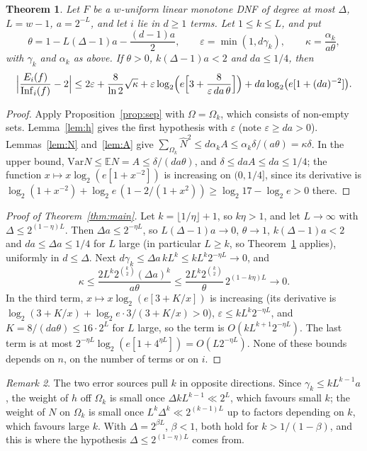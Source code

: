 \documentclass[11pt]{amsart}
\newtheorem{theorem}{Theorem}
\theoremstyle{remark}
\newtheorem{remark}[theorem]{Remark}
\newcommand{\Inf}{\mathrm{Inf}}
\newcommand{\Var}{\mathrm{Var}}
\newcommand{\E}{\mathbb{E}}
\begin{document}
\begin{theorem}\label{thm:lin}
Let $F$ be a $w$-uniform linear monotone DNF of degree at most $\Delta$, $L=w-1$, $a=2^{-L}$, and let $i$ lie in $d\ge1$
terms. Let $1\le k\le L$, and put
\[
\theta=1-L(\Delta-1)a-\frac{(d-1)a}2,\qquad \varepsilon=\min(1,d\gamma_k),\qquad \kappa=\frac{\alpha_k}{a\theta},
\]
with $\gamma_k$ and $\alpha_k$ as above. If $\theta>0$, $k(\Delta-1)a<2$ and $da\le1/4$, then
\[
\Bigl|\frac{E_i(f)}{\Inf_i(f)}-2\Bigr|\le2\varepsilon+\frac8{\ln2}\sqrt\kappa
+\varepsilon\log_2\Bigl(e\Bigl[3+\frac{8}{\varepsilon\,da\,\theta}\Bigr]\Bigr)+da\log_2\bigl(e[1+(da)^{-2}]\bigr).
\]
\end{theorem}

\begin{proof}
Apply Proposition~\ref{prop:sep} with $\Omega=\Omega_k$, which consists of non-empty sets. Lemma~\ref{lem:h} gives the
first hypothesis with $\varepsilon$ (note $\varepsilon\ge da>0$). Lemmas~\ref{lem:N} and~\ref{lem:A} give
$\sum_{\Omega_k}\hat N^2\le d\alpha_kA\le\alpha_k\delta/(a\theta)=\kappa\delta$. In the upper bound, $\Var N\le\E N=A\le
\delta/(da\theta)$, and $\delta\le daA\le da\le1/4$; the function $x\mapsto x\log_2(e[1+x^{-2}])$ is increasing on
$(0,1/4]$, since its derivative is $\log_2(1+x^{-2})+\log_2e\,(1-2/(1+x^2))\ge\log_2 17-\log_2e>0$ there.
\end{proof}

\begin{proof}[Proof of Theorem~\ref{thm:main}]
Let $k=\lfloor1/\eta\rfloor+1$, so $k\eta>1$, and let $L\to\infty$ with $\Delta\le2^{(1-\eta)L}$. Then $\Delta a\le2^{-\eta L}$,
so $L(\Delta-1)a\to0$, $\theta\to1$, $k(\Delta-1)a<2$ and $da\le \Delta a\le1/4$ for $L$ large (in particular $L\ge k$, so Theorem~\ref{thm:lin} applies), uniformly in $d\le \Delta$. Next
$d\gamma_k\le \Delta a\,kL^k\le kL^k2^{-\eta L}\to0$, and
\[
\kappa\le\frac{2L^k2^{\binom k2}(\Delta a)^k}{a\theta}\le\frac{2L^k2^{\binom k2}}{\theta}\,2^{(1-k\eta)L}\to0.
\]
In the third term, $x\mapsto x\log_2(e[3+K/x])$ is increasing (its derivative is $\log_2(3+K/x)+\log_2e\cdot3/(3+K/x)>0$), $\varepsilon\le kL^k2^{-\eta L}$, and $K=8/(da\theta)\le
16\cdot2^L$ for $L$ large, so the term is $O(kL^{k+1}2^{-\eta L})$. The last term is at most
$2^{-\eta L}\log_2(e[1+4^{\eta L}])=O(L2^{-\eta L})$. None of these bounds depends on $n$, on the number of terms or on
$i$.
\end{proof}

\begin{remark}
The two error sources pull $k$ in opposite directions. Since $\gamma_k\le kL^{k-1}a$, the weight of $h$ off $\Omega_k$ is
small once $\Delta kL^{k-1}\ll2^L$, which favours small $k$; the weight of $N$ on $\Omega_k$ is small once
$L^k\Delta^k\ll2^{(k-1)L}$ up to factors depending on $k$, which favours large $k$. With $\Delta=2^{\beta L}$, $\beta<1$, both
hold for $k>1/(1-\beta)$, and this is where the hypothesis $\Delta\le2^{(1-\eta)L}$ comes from.
\end{remark}
\end{document}
